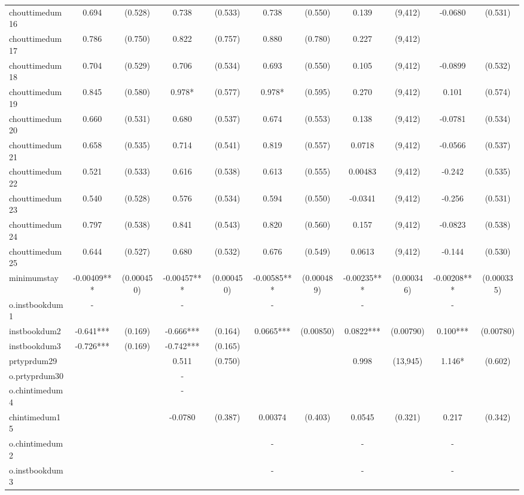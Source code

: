 \documentclass[]{article}
\begin{document}
\begin{tabular}{lcccccccccc}
chouttimedum16 & 0.694 & (0.528) & 0.738 & (0.533) & 0.738 & (0.550) & 0.139 & (9,412) & -0.0680 & (0.531) \\
chouttimedum17 & 0.786 & (0.750) & 0.822 & (0.757) & 0.880 & (0.780) & 0.227 & (9,412) &  &  \\
chouttimedum18 & 0.704 & (0.529) & 0.706 & (0.534) & 0.693 & (0.550) & 0.105 & (9,412) & -0.0899 & (0.532) \\
chouttimedum19 & 0.845 & (0.580) & 0.978* & (0.577) & 0.978* & (0.595) & 0.270 & (9,412) & 0.101 & (0.574) \\
chouttimedum20 & 0.660 & (0.531) & 0.680 & (0.537) & 0.674 & (0.553) & 0.138 & (9,412) & -0.0781 & (0.534) \\
chouttimedum21 & 0.658 & (0.535) & 0.714 & (0.541) & 0.819 & (0.557) & 0.0718 & (9,412) & -0.0566 & (0.537) \\
chouttimedum22 & 0.521 & (0.533) & 0.616 & (0.538) & 0.613 & (0.555) & 0.00483 & (9,412) & -0.242 & (0.535) \\
chouttimedum23 & 0.540 & (0.528) & 0.576 & (0.534) & 0.594 & (0.550) & -0.0341 & (9,412) & -0.256 & (0.531) \\
chouttimedum24 & 0.797 & (0.538) & 0.841 & (0.543) & 0.820 & (0.560) & 0.157 & (9,412) & -0.0823 & (0.538) \\
chouttimedum25 & 0.644 & (0.527) & 0.680 & (0.532) & 0.676 & (0.549) & 0.0613 & (9,412) & -0.144 & (0.530) \\
minimumstay & -0.00409*** & (0.000450) & -0.00457*** & (0.000450) & -0.00585*** & (0.000489) & -0.00235*** & (0.000346) & -0.00208*** & (0.000335) \\
o.instbookdum1 & - &  & - &  & - &  & - &  & - &  \\
instbookdum2 & -0.641*** & (0.169) & -0.666*** & (0.164) & 0.0665*** & (0.00850) & 0.0822*** & (0.00790) & 0.100*** & (0.00780) \\
instbookdum3 & -0.726*** & (0.169) & -0.742*** & (0.165) &  &  &  &  &  &  \\
prtyprdum29 &  &  & 0.511 & (0.750) &  &  & 0.998 & (13,945) & 1.146* & (0.602) \\
o.prtyprdum30 &  &  & - &  &  &  &  &  &  &  \\
o.chintimedum4 &  &  & - &  &  &  &  &  &  &  \\
chintimedum15 &  &  & -0.0780 & (0.387) & 0.00374 & (0.403) & 0.0545 & (0.321) & 0.217 & (0.342) \\
o.chintimedum2 &  &  &  &  & - &  & - &  & - &  \\
o.instbookdum3 &  &  &  &  & - &  & - &  & - &  \\

\end{tabular}
\end{document}
